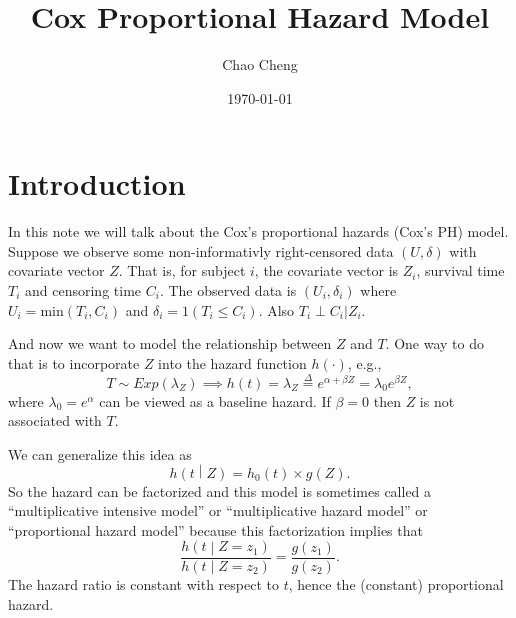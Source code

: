 \documentclass[a4paper,12pt]{article}
\title{Cox Proportional Hazard Model}
\author{Chao Cheng}
\date{\today}
\begin{document}
\maketitle
\tableofcontents{}

\section{Introduction}
\label{sec:introduction}

In this note we will talk about the Cox's proportional hazards (Cox's PH) model. Suppose we observe some non-informativly right-censored data $\left(U, \delta\right)$ with covariate vector $Z$. That is, for subject $i$, the covariate vector is $Z_i$, survival time $T_i$ and censoring time $C_i$. The observed data is $\left(U_i, \delta_i\right)$ where $U_i = \mathrm{min}\left(T_i, C_i\right)$ and $\delta_i = 1\left(T_i \leq C_i\right)$. Also $T_i \perp C_i | Z_i$.
\par
And now we want to model the relationship between $Z$ and $T$. One way to do that is to incorporate $Z$ into the hazard function $h\left(\cdot\right)$, e.g.,
\[
  T \sim Exp\left(\lambda_Z\right)
  \implies
  h\left(t\right) = \lambda_Z
  \overset{\Delta}{=} e^{\alpha + \beta Z} = \lambda_0 e^{\beta Z}
  ,
\]
where $\lambda_0 = e^{\alpha}$ can be viewed as a baseline hazard. If $\beta = 0$ then $Z$ is not associated with $T$.
\par
We can generalize this idea as
\[
  h\left(t\middle|Z\right)
  = h_0\left(t\right) \times g\left(Z\right)
  .
\]
So the hazard can be factorized and this model is sometimes called a ``multiplicative intensive model'' or ``multiplicative hazard model'' or ``proportional hazard model'' because this factorization implies that
\[
  \frac{
    h\left(t\middle| Z = z_1\right)}{
    h\left(t\middle| Z = z_2\right)
  }
  = \frac{g\left(z_1\right)}{g\left(z_2\right)}
  .
\]
The hazard ratio is constant with respect to $t$, hence the (constant) proportional hazard.





\end{document}
